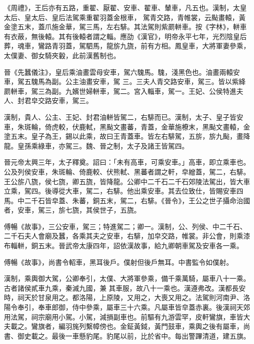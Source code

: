 \begin{pinyinscope}
 《周禮》，王后亦有五路，重翟、厭翟、安車、翟車、輦車，凡五也。漢制，太皇太后、皇太后、皇后法駕乘重翟羽蓋金根車，
 駕青交路，青帷裳，云颭畫轅，黃金塗五末，蓋爪施金華，駕三馬，左右騑。其法駕則紫罽軿車。按《字林》，軿車有衣蔽，無後轅。其有後轅者謂之輜。應劭《漢官》，明帝永平七年，光烈陰皇后葬，魂車，鸞路青羽蓋，駕駟馬，龍旂九旒，前有方相。鳳皇車，大將軍妻參乘，太僕妻、御女騎夾轂，此前漢舊制也。



 晉《先蠶儀注》，皇后乘油畫雲母安車，駕六騩馬。騩，淺黑色也。油畫兩轅安車，駕五騩馬為副。公主油畫安車，駕
 三。三夫人青交路安車，駕三。皆以紫絳罽軿車，駕三為副。九嬪世婦軿車，駕二。宮入輜車，駕一。王妃、公侯特進夫人、封君皁交路安車，駕三。



 漢制，貴人、公主、王妃、封君油軿皆駕二，右騑而已。漢制，太子、皇子皆安車，朱斑輪，倚虎較，伏鹿軾，黑颭文畫蕃，青蓋，金華施橑末，黑颭文畫轅，金塗五末。皇子為王，錫以此乘，故曰王青蓋車。皆左右騑駕，五旂，旂九颭，畫降龍。皇孫乘綠車，亦駕三。魏、晉之制，太子及諸王皆駕四。



 晉元帝太興三年，太子釋奠。詔曰：「未有高車，可乘安車。」高車，即立乘車也。公及列侯安車，朱斑輪、倚鹿較、伏熊軾、黑蕃者謂之軒，皁繒蓋，駕二，右騑。王公旂八旒，侯七旒，卿五旒，皆降龍。公卿中二千石二千石郊陵法駕出，皆大車立乘，駕四。後導從大車，駕二，右騑。他出乘安車。其去位致仕，皆賜安車四馬。中二千石皆皁蓋、朱蕃，銅五末，駕二，右騑。《晉令》，王公之世子攝命治國者，安車，駕三，旂七旒，其侯世子，五旒。



 傅暢《故事》，三公安車，駕三；特進駕二；卿一。漢制，公、列侯、中二千石、二千石夫人會廟及蠶，各乘其夫之安車，右騑，加皁交路，帷裳。非公會，則乘漆布輜軿，銅五末。晉武帝太康四年，詔依漢故事，給九卿朝車駕及安車各一乘。



 傅暢《故事》，尚書令軺車，黑耳後戶。僕射但後戶無耳。中書監令如僕射。



 漢制，乘輿御大駕，公卿奉引，太僕、大將軍參乘，備千乘萬騎，屬車八十一乘。古者諸侯貳車九乘，秦滅九國，兼
 其車服，故八十一乘也。漢遵弗改。漢都長安時，祠天於甘泉用之。都洛陽，上原陵，又用之，大喪又用之。法駕則河南尹、洛陽令奉引，奉車郎御，侍中參乘，屬車三十六乘。凡屬車皆皁蓋赤裏。後漢祠天郊用法駕，祠宗廟用小駕。小駕，減損副車也。前驅有九游雲罕，皮軒鸞旗，車皆大夫載之。鸞旗者，編羽旄列繫幛傍也。金鉦黃鉞，黃門鼓車，乘輿之後有屬車，尚書、御史載之。最後一車懸豹尾。豹尾以前，比於省中。每出警蹕清道，建五旗。




\end{pinyinscope}
